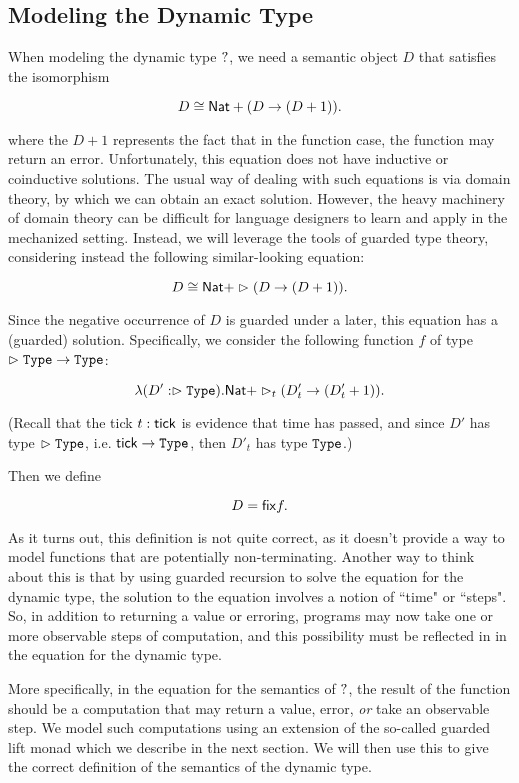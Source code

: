 \subsection{Modeling the Dynamic Type}

When modeling the dynamic type $?$, we need a semantic object $D$ that satisfies the
isomorphism

\[ D \cong \mathsf{Nat} + (D \to (D + 1)). \]

where the $D + 1$ represents the fact that in the function case, the function may return an error.
Unfortunately, this equation does not have inductive or coinductive solutions. The usual way of
dealing with such equations is via domain theory, by which we can obtain an exact solution.
However, the heavy machinery of domain theory can be difficult for language designers to learn
and apply in the mechanized setting.
Instead, we will leverage the tools of guarded type theory, considering instead the following
similar-looking equation:

\[ D \cong \mathsf{Nat} + \vartriangleright (D \to (D + 1)). \]

Since the negative occurrence of $D$ is guarded under a later, this equation has a (guarded) solution.
Specifically, we consider the following function $f$ of type
$\vartriangleright \texttt{Type} \to \texttt{Type}$:

\[ \lambda (D' : \vartriangleright \texttt{Type}) . \mathsf{Nat} + \vartriangleright_t (D'_t \to (D'_t + 1)). \]

(Recall that the tick $t : \mathsf{tick}$ is evidence that time has passed, and since
$D'$ has type $\vartriangleright \texttt{Type}$, i.e. $\mathsf{tick} \to \texttt{Type}$, then $D'_t$ has type $\texttt{Type}$.)

Then we define 

\[ D = \mathsf{fix} f. \]

As it turns out, this definition is not quite correct, as it doesn't provide a way to
model functions that are potentially non-terminating.
Another way to think about this is that by using guarded recursion to solve the
equation for the dynamic type, the solution to the equation involves a notion of
``time" or ``steps".
So, in addition to returning a value or erroring, programs may now take one or
more observable steps of computation, and this possibility must be reflected in
in the equation for the dynamic type.

More specifically, in the equation for the semantics of $?$, the result of the
function should be a computation that may return a value, error, \emph{or} take an observable step.
We model such computations using an extension of the so-called guarded lift monad
\cite{mogelberg-paviotti2016} which we describe in the next section.
We will then use this to give the correct definition of the semantics of the dynamic type.

